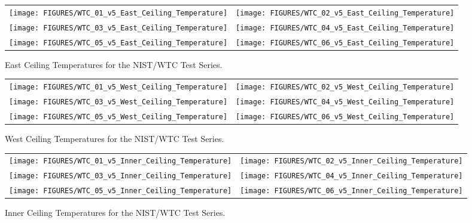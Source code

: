 \begin{figure}[p]
\begin{tabular*}{\textwidth}{l@{\extracolsep{\fill}}r}
\texttt{[image: FIGURES/WTC\_01\_v5\_East\_Ceiling\_Temperature]} &
\texttt{[image: FIGURES/WTC\_02\_v5\_East\_Ceiling\_Temperature]} \\
\texttt{[image: FIGURES/WTC\_03\_v5\_East\_Ceiling\_Temperature]} &
\texttt{[image: FIGURES/WTC\_04\_v5\_East\_Ceiling\_Temperature]} \\
\texttt{[image: FIGURES/WTC\_05\_v5\_East\_Ceiling\_Temperature]} &
\texttt{[image: FIGURES/WTC\_06\_v5\_East\_Ceiling\_Temperature]}
\end{tabular*}
\caption{East Ceiling Temperatures for the NIST/WTC Test Series.}
\label{NIST_WTC East_Ceiling_Temp}
\end{figure}

\begin{figure}[p]
\begin{tabular*}{\textwidth}{l@{\extracolsep{\fill}}r}
\texttt{[image: FIGURES/WTC\_01\_v5\_West\_Ceiling\_Temperature]} &
\texttt{[image: FIGURES/WTC\_02\_v5\_West\_Ceiling\_Temperature]} \\
\texttt{[image: FIGURES/WTC\_03\_v5\_West\_Ceiling\_Temperature]} &
\texttt{[image: FIGURES/WTC\_04\_v5\_West\_Ceiling\_Temperature]} \\
\texttt{[image: FIGURES/WTC\_05\_v5\_West\_Ceiling\_Temperature]} &
\texttt{[image: FIGURES/WTC\_06\_v5\_West\_Ceiling\_Temperature]}
\end{tabular*}
\caption{West Ceiling Temperatures for the NIST/WTC Test Series.}
\label{NIST_WTC West_Ceiling_Temp}
\end{figure}

\begin{figure}[p]
\begin{tabular*}{\textwidth}{l@{\extracolsep{\fill}}r}
\texttt{[image: FIGURES/WTC\_01\_v5\_Inner\_Ceiling\_Temperature]} &
\texttt{[image: FIGURES/WTC\_02\_v5\_Inner\_Ceiling\_Temperature]} \\
\texttt{[image: FIGURES/WTC\_03\_v5\_Inner\_Ceiling\_Temperature]} &
\texttt{[image: FIGURES/WTC\_04\_v5\_Inner\_Ceiling\_Temperature]} \\
\texttt{[image: FIGURES/WTC\_05\_v5\_Inner\_Ceiling\_Temperature]} &
\texttt{[image: FIGURES/WTC\_06\_v5\_Inner\_Ceiling\_Temperature]}
\end{tabular*}
\caption{Inner Ceiling Temperatures for the NIST/WTC Test Series.}
\label{NIST_WTC Inner_Ceiling_Temp}
\end{figure}

